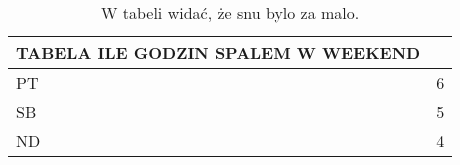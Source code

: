 \begin{table}[ht]
\centering
\begin{tabular}{|l|l|}
\hline
\textbf{TABELA ILE GODZIN SPALEM W  WEEKEND} &   \\ \hline
PT                                           & 6 \\ \hline
SB                                           & 5 \\ \hline
ND                                           & 4 \\ \hline
\end{tabular}
\caption{W tabeli widać, że snu bylo za malo.}
\end{table}

\label{tab:weekend}